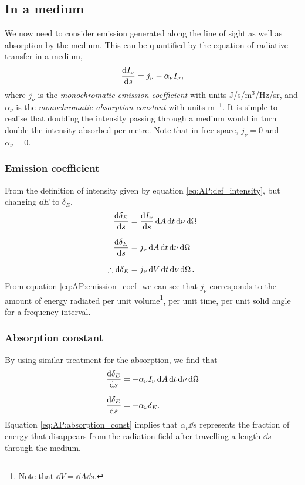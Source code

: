 \subsection{In a medium}
We now need  to consider emission generated along the line of sight as well as absorption by the medium.
 This can be quantified by the equation of radiative transfer in a medium,
%
\begin{equation}
	\dv{I_\nu}{s} = j_\nu - \alpha_\nu I_\nu,
	\label{eq:AP:radiative_transfer}
\end{equation}
%
where \(j_\nu\) is the \emph{monochromatic emission coefficient} with units J/s/m\(^3\)/Hz/sr, and \(\alpha_\nu\) is the \emph{monochromatic absorption constant} with units m\(^{-1}\).
 It is simple to realise that doubling the intensity passing through a medium would in turn double the intensity absorbed per metre.
 Note that in free space, \(j_\nu = 0\) and \(\alpha_\nu = 0\).
\par
%
\subsubsection{Emission coefficient}
From the definition of intensity given by equation \ref{eq:AP:def_intensity}, but changing \(\dd{E}\) to \(\delta_E\),
%
\begin{align}
	\dv{\delta_E}{s} &= \dv{I_\nu}{s} \dd{A} \dd{t} \dd{\nu} \dd{\Omega}
	\linedrop
	\dv{\delta_E}{s} &= j_\nu \dd{A} \dd{t} \dd{\nu} \dd{\Omega}
	\linedrop
	\therefore \dd{\delta_E} &= j_\nu \dd{V} \dd{t} \dd{\nu} \dd{\Omega}.
	\label{eq:AP:emission_coef}
\end{align}
%
From equation \ref{eq:AP:emission_coef} we can see that \(j_\nu\) corresponds to the amount of energy radiated per unit volume\footnote{Note that \(\dd{V} = \dd{A} \dd{s}\).}, per unit time, per unit solid angle for a frequency interval.
% 
\subsubsection{Absorption constant}
By using similar treatment for the absorption, we find that
%
\begin{align}
		\dv{\delta_E}{s} &= -\alpha_\nu I_\nu  \dd{A} \dd{t} \dd{\nu} \dd{\Omega}
		\linedrop
		\dv{\delta_E}{s} &= -\alpha_\nu \delta_E.
		\label{eq:AP:absorption_const}
\end{align}
%
Equation \ref{eq:AP:absorption_const} implies that \(\alpha_\nu \dd{s}\) represents the fraction of energy that disappears from the radiation field after travelling a length \(\dd{s}\) through the medium.
%  
